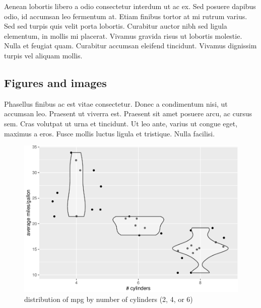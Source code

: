 \documentclass[
  english,
  man,floatsintext]{apa6}
\begin{document}
Aenean lobortis libero a odio consectetur interdum ut ac ex. Sed posuere dapibus odio, id accumsan leo fermentum at. Etiam finibus tortor at mi rutrum varius. Sed sed turpis quis velit porta lobortis. Curabitur auctor nibh sed ligula elementum, in mollis mi placerat. Vivamus gravida risus ut lobortis molestie. Nulla et feugiat quam. Curabitur accumsan eleifend tincidunt. Vivamus dignissim turpis vel aliquam mollis.

\hypertarget{figures-and-images}{%
\subsection{Figures and images}\label{figures-and-images}}

Phasellus finibus ac est vitae consectetur. Donec a condimentum nisi, ut accumsan leo. Praesent ut viverra est. Praesent sit amet posuere arcu, ac cursus sem. Cras volutpat ut urna et tincidunt. Ut leo ante, varius ut congue eget, maximus a eros. Fusce mollis luctus ligula et tristique. Nulla facilisi.

\begin{figure}
\centering
\includegraphics{example_rmd_files/figure-latex/fig-avgmpg-1.pdf}
\caption{\label{fig:fig-avgmpg}distribution of mpg by number of cylinders (2, 4, or 6)}
\end{figure}
\end{document}
